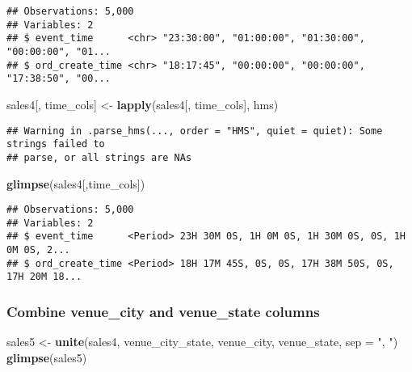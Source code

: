 \documentclass[]{article}
\newenvironment{Shaded}{\begin{snugshade}}{\end{snugshade}}
\newcommand{\DataTypeTok}[1]{\textcolor[rgb]{0.13,0.29,0.53}{#1}}
\newcommand{\KeywordTok}[1]{\textcolor[rgb]{0.13,0.29,0.53}{\textbf{#1}}}
\newcommand{\NormalTok}[1]{#1}
\newcommand{\StringTok}[1]{\textcolor[rgb]{0.31,0.60,0.02}{#1}}
\begin{document}
\begin{verbatim}
## Observations: 5,000
## Variables: 2
## $ event_time      <chr> "23:30:00", "01:00:00", "01:30:00", "00:00:00", "01...
## $ ord_create_time <chr> "18:17:45", "00:00:00", "00:00:00", "17:38:50", "00...
\end{verbatim}

\begin{Shaded}
\begin{Highlighting}[]
\NormalTok{sales4[, time_cols] <-}\StringTok{ }\KeywordTok{lapply}\NormalTok{(sales4[, time_cols], hms)}
\end{Highlighting}
\end{Shaded}

\begin{verbatim}
## Warning in .parse_hms(..., order = "HMS", quiet = quiet): Some strings failed to
## parse, or all strings are NAs
\end{verbatim}

\begin{Shaded}
\begin{Highlighting}[]
\KeywordTok{glimpse}\NormalTok{(sales4[,time_cols])}
\end{Highlighting}
\end{Shaded}

\begin{verbatim}
## Observations: 5,000
## Variables: 2
## $ event_time      <Period> 23H 30M 0S, 1H 0M 0S, 1H 30M 0S, 0S, 1H 0M 0S, 2...
## $ ord_create_time <Period> 18H 17M 45S, 0S, 0S, 17H 38M 50S, 0S, 17H 20M 18...
\end{verbatim}

\hypertarget{combine-venue_city-and-venue_state-columns}{%
\subsubsection{Combine venue\_city and venue\_state
columns}\label{combine-venue_city-and-venue_state-columns}}

\begin{Shaded}
\begin{Highlighting}[]
\NormalTok{sales5 <-}\StringTok{ }\KeywordTok{unite}\NormalTok{(sales4, venue_city_state, venue_city, venue_state, }\DataTypeTok{sep =} \StringTok{", "}\NormalTok{)}
\KeywordTok{glimpse}\NormalTok{(sales5)}
\end{Highlighting}
\end{Shaded}
\end{document}
